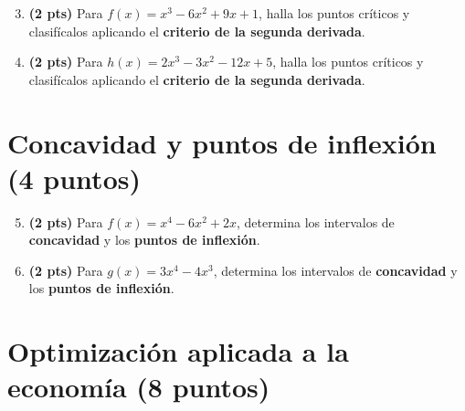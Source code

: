 \documentclass[12pt, letterpaper]{article}
\begin{document}
\begin{enumerate}[leftmargin=*]
  \setcounter{enumi}{2}
  \item \textbf{(2 pts)} Para $f(x) = x^{3} - 6x^{2} + 9x + 1$, halla los puntos críticos y clasifícalos aplicando el \textbf{criterio de la segunda derivada}.

  \item \textbf{(2 pts)} Para $h(x) = 2x^{3} - 3x^{2} - 12x + 5$, halla los puntos críticos y clasifícalos aplicando el \textbf{criterio de la segunda derivada}.
\end{enumerate}

\section{Concavidad y puntos de inflexión (4 puntos)}

\begin{enumerate}[leftmargin=*]
  \setcounter{enumi}{4}
  \item \textbf{(2 pts)} Para $f(x) = x^{4} - 6x^{2} + 2x$, determina los intervalos de \textbf{concavidad} y los \textbf{puntos de inflexión}.

  \item \textbf{(2 pts)} Para $g(x) = 3x^{4} - 4x^{3}$, determina los intervalos de \textbf{concavidad} y los \textbf{puntos de inflexión}.
\end{enumerate}

\section{Optimización aplicada a la economía (8 puntos)}
\end{document}
